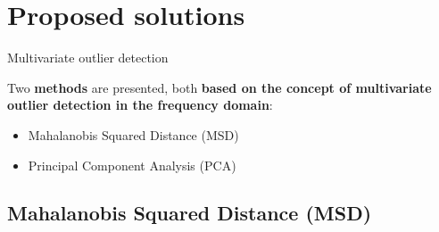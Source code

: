 \section{Proposed solutions}

\begin{frame}{Multivariate outlier detection}

    Two \textbf{methods} are presented, both \textbf{based on the concept of multivariate outlier detection in the frequency domain}:

    \begin{itemize}
        \item Mahalanobis Squared Distance (MSD)
        \item Principal Component Analysis (PCA)
    \end{itemize}

\end{frame}



\subsection{Mahalanobis Squared Distance (MSD)}

